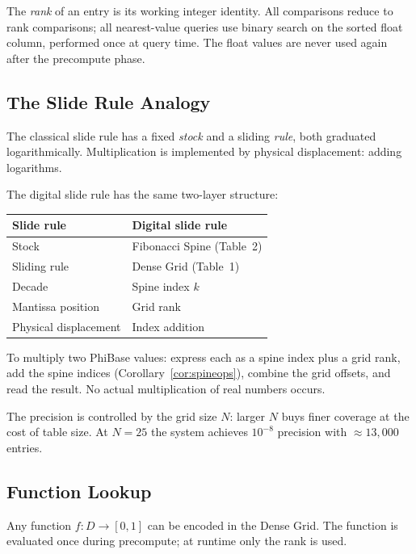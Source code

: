 \documentclass[12pt]{article}
\theoremstyle{definition}
\theoremstyle{remark}
\begin{document}
The \emph{rank} of an entry is its working integer identity.  All
comparisons reduce to rank comparisons; all nearest-value queries use
binary search on the sorted float column, performed once at query time.
The float values are never used again after the precompute phase.

\subsection{The Slide Rule Analogy}

The classical slide rule has a fixed \emph{stock} and a sliding
\emph{rule}, both graduated logarithmically.  Multiplication is
implemented by physical displacement: adding logarithms.

The digital slide rule has the same two-layer structure:

\begin{center}
\renewcommand{\arraystretch}{1.3}
\begin{tabular}{ll}
\toprule
Slide rule & Digital slide rule \\
\midrule
Stock & Fibonacci Spine (Table~2) \\
Sliding rule & Dense Grid (Table~1) \\
Decade & Spine index $k$ \\
Mantissa position & Grid rank \\
Physical displacement & Index addition \\
\bottomrule
\end{tabular}
\end{center}

To multiply two PhiBase values: express each as a spine index plus
a grid rank, add the spine indices (Corollary~\ref{cor:spineops}),
combine the grid offsets, and read the result.  No actual multiplication
of real numbers occurs.

The precision is controlled by the grid size $N$: larger $N$ buys
finer coverage at the cost of table size.  At $N=25$ the system
achieves $10^{-8}$ precision with $\approx 13{,}000$ entries.

\subsection{Function Lookup}

Any function $f : D \to [0,1]$ can be encoded in the Dense Grid.
The function is evaluated once during precompute; at runtime only
the rank is used.
\end{document}
